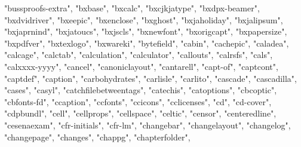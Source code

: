 \documentclass[
]{article}
\newenvironment{Shaded}{\begin{snugshade}}{\end{snugshade}}
\newcommand{\NormalTok}[1]{#1}
\newcommand{\StringTok}[1]{\textcolor[rgb]{0.31,0.60,0.02}{#1}}
\begin{document}
\begin{Shaded}
\begin{Highlighting}[]
\StringTok{"bussproofs{-}extra"}\NormalTok{, }\StringTok{"bxbase"}\NormalTok{, }\StringTok{"bxcalc"}\NormalTok{, }\StringTok{"bxcjkjatype"}\NormalTok{, }\StringTok{"bxdpx{-}beamer"}\NormalTok{, }
\StringTok{"bxdvidriver"}\NormalTok{, }\StringTok{"bxeepic"}\NormalTok{, }\StringTok{"bxenclose"}\NormalTok{, }\StringTok{"bxghost"}\NormalTok{, }\StringTok{"bxjaholiday"}\NormalTok{, }
\StringTok{"bxjalipsum"}\NormalTok{, }\StringTok{"bxjaprnind"}\NormalTok{, }\StringTok{"bxjatoucs"}\NormalTok{, }\StringTok{"bxjscls"}\NormalTok{, }\StringTok{"bxnewfont"}\NormalTok{, }
\StringTok{"bxorigcapt"}\NormalTok{, }\StringTok{"bxpapersize"}\NormalTok{, }\StringTok{"bxpdfver"}\NormalTok{, }\StringTok{"bxtexlogo"}\NormalTok{, }\StringTok{"bxwareki"}\NormalTok{, }
\StringTok{"bytefield"}\NormalTok{, }\StringTok{"cabin"}\NormalTok{, }\StringTok{"cachepic"}\NormalTok{, }\StringTok{"caladea"}\NormalTok{, }\StringTok{"calcage"}\NormalTok{, }\StringTok{"calctab"}\NormalTok{, }
\StringTok{"calculation"}\NormalTok{, }\StringTok{"calculator"}\NormalTok{, }\StringTok{"callouts"}\NormalTok{, }\StringTok{"calrsfs"}\NormalTok{, }\StringTok{"cals"}\NormalTok{, }\StringTok{"calxxxx{-}yyyy"}\NormalTok{, }
\StringTok{"cancel"}\NormalTok{, }\StringTok{"canoniclayout"}\NormalTok{, }\StringTok{"cantarell"}\NormalTok{, }\StringTok{"capt{-}of"}\NormalTok{, }\StringTok{"captcont"}\NormalTok{, }
\StringTok{"captdef"}\NormalTok{, }\StringTok{"caption"}\NormalTok{, }\StringTok{"carbohydrates"}\NormalTok{, }\StringTok{"carlisle"}\NormalTok{, }\StringTok{"carlito"}\NormalTok{, }
\StringTok{"cascade"}\NormalTok{, }\StringTok{"cascadilla"}\NormalTok{, }\StringTok{"cases"}\NormalTok{, }\StringTok{"casyl"}\NormalTok{, }\StringTok{"catchfilebetweentags"}\NormalTok{, }
\StringTok{"catechis"}\NormalTok{, }\StringTok{"catoptions"}\NormalTok{, }\StringTok{"cbcoptic"}\NormalTok{, }\StringTok{"cbfonts{-}fd"}\NormalTok{, }\StringTok{"ccaption"}\NormalTok{, }
\StringTok{"ccfonts"}\NormalTok{, }\StringTok{"ccicons"}\NormalTok{, }\StringTok{"cclicenses"}\NormalTok{, }\StringTok{"cd"}\NormalTok{, }\StringTok{"cd{-}cover"}\NormalTok{, }\StringTok{"cdpbundl"}\NormalTok{, }
\StringTok{"cell"}\NormalTok{, }\StringTok{"cellprops"}\NormalTok{, }\StringTok{"cellspace"}\NormalTok{, }\StringTok{"celtic"}\NormalTok{, }\StringTok{"censor"}\NormalTok{, }\StringTok{"centeredline"}\NormalTok{, }
\StringTok{"cesenaexam"}\NormalTok{, }\StringTok{"cfr{-}initials"}\NormalTok{, }\StringTok{"cfr{-}lm"}\NormalTok{, }\StringTok{"changebar"}\NormalTok{, }\StringTok{"changelayout"}\NormalTok{, }
\StringTok{"changelog"}\NormalTok{, }\StringTok{"changepage"}\NormalTok{, }\StringTok{"changes"}\NormalTok{, }\StringTok{"chappg"}\NormalTok{, }\StringTok{"chapterfolder"}\NormalTok{, }

\end{Highlighting}
\end{Shaded}
\end{document}
